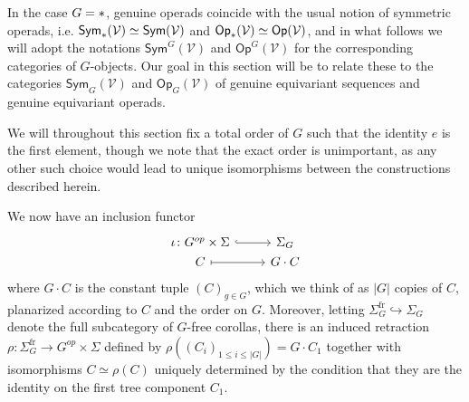 \documentclass[a4paper,10pt
,draft
]{article}%
\numberwithin{equation}{section}
\numberwithin{figure}{section}
\theoremstyle{definition} %
\newcommand{\1}{\ensuremath{\mathbbm 1}}%
\begin{document}
In the case $G = \**$, genuine operads coincide with the usual notion of symmetric operads, i.e. 
$\mathsf{Sym}_{\**}(\mathcal{V})
\simeq \mathsf{Sym}(\mathcal{V})$
and
$\mathsf{Op}_{\**}(\mathcal{V})
\simeq \mathsf{Op}(\mathcal{V})$, 
and in what follows we will adopt the notations
$\mathsf{Sym}^G(\mathcal{V})$ and
$\mathsf{Op}^G(\mathcal{V})$ 
for the corresponding categories of $G$-objects.
Our goal in this section will be to relate these to the categories
$\mathsf{Sym}_G(\mathcal{V})$ and $\mathsf{Op}_G(\mathcal{V})$
of genuine equivariant sequences and genuine equivariant operads.

We will throughout this section fix a total order of $G$ such that the identity $e$ is the first element, though we note that the exact order is unimportant, as any other such choice would lead to unique isomorphisms between the constructions described herein.

We now have an inclusion functor
\[
\begin{tikzcd}[row sep =0]
	\iota \colon G^{op} \times \Sigma \ar[hookrightarrow]{r} &
	\Sigma_G
\\
	C \ar[mapsto]{r} & G \cdot C
\end{tikzcd}
\]
where $G \cdot C$ is the constant tuple $(C)_{g \in G}$,
which we think of as $|G|$ copies of $C$, planarized according to $C$ and the order on $G$.
Moreover, letting $\Sigma_G^{\text{fr}} \hookrightarrow \Sigma_G$ denote the full subcategory of $G$-free corollas, there is an induced retraction 
$\rho \colon \Sigma_{G}^{\text{fr}} \to G^{op} \times \Sigma$
defined by 
$\rho\left( (C_i)_{1\leq i \leq |G|} \right) = G \cdot C_1$
together with isomorphisms 
$C \simeq \rho(C)$
uniquely determined by the condition that they
are the identity on the first tree component $C_1$.
\end{document}
